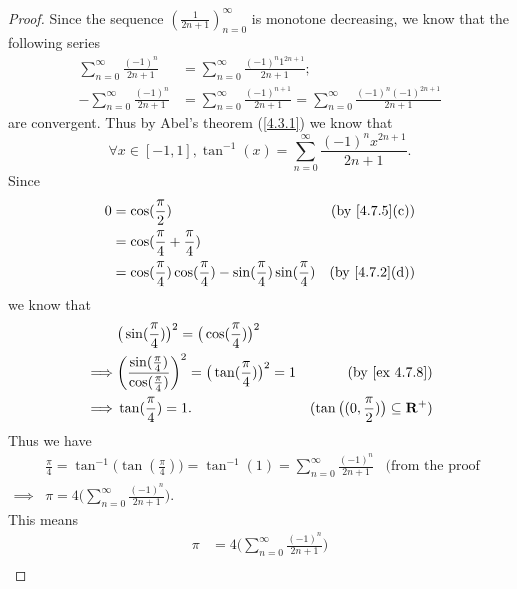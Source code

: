 \begin{proof}
  Since the sequence \((\frac{1}{2n + 1})_{n = 0}^\infty\) is monotone decreasing, we know that the following series
  \begin{align*}
    \sum_{n = 0}^\infty \frac{(-1)^n}{2n + 1}  & = \sum_{n = 0}^\infty \frac{(-1)^n 1^{2n + 1}}{2n + 1};                                                     \\
    -\sum_{n = 0}^\infty \frac{(-1)^n}{2n + 1} & = \sum_{n = 0}^\infty \frac{(-1)^{n + 1}}{2n + 1} = \sum_{n = 0}^\infty \frac{(-1)^n (-1)^{2n + 1}}{2n + 1}
  \end{align*}
  are convergent.
  Thus by Abel's theorem (\cref{4.3.1}) we know that
  \[
    \forall x \in [-1, 1], \tan^{-1}(x) = \sum_{n = 0}^\infty \frac{(-1)^n x^{2n + 1}}{2n + 1}.
  \]
  Since
  \begin{align*}
    0 & = \cos(\frac{\pi}{2})                                                               & \text{(by \cref{4.7.5}(c))} \\
      & = \cos(\frac{\pi}{4} + \frac{\pi}{4})                                                                             \\
      & = \cos(\frac{\pi}{4}) \cos(\frac{\pi}{4}) - \sin(\frac{\pi}{4}) \sin(\frac{\pi}{4}) & \text{(by \cref{4.7.2}(d))}
  \end{align*}
  we know that
  \begin{align*}
             & \big(\sin(\frac{\pi}{4})\big)^2 = \big(\cos(\frac{\pi}{4})\big)^2                                                                                       \\
    \implies & \bigg(\frac{\sin(\frac{\pi}{4})}{\cos(\frac{\pi}{4})}\bigg)^2 = \big(\tan(\frac{\pi}{4})\big)^2 = 1 & \text{(by \cref{ex 4.7.8})}                       \\
    \implies & \tan(\frac{\pi}{4}) = 1.                                                                            & (\tan\big((0, \frac{\pi}{2})\big) \subseteq \R^+)
  \end{align*}
  Thus we have
  \begin{align*}
             & \frac{\pi}{4} = \tan^{-1}\big(\tan(\frac{\pi}{4})\big) = \tan^{-1}(1) = \sum_{n = 0}^\infty \frac{(-1)^n}{2n + 1} & \text{(from the proof above)} \\
    \implies & \pi = 4 \bigg(\sum_{n = 0}^\infty \frac{(-1)^n}{2n + 1}\bigg).
  \end{align*}
  This means
  \begin{align*}
    \pi & = 4 \bigg(\sum_{n = 0}^\infty \frac{(-1)^n}{2n + 1}\bigg)                                                                             \\

\end{align*}
\end{proof}

